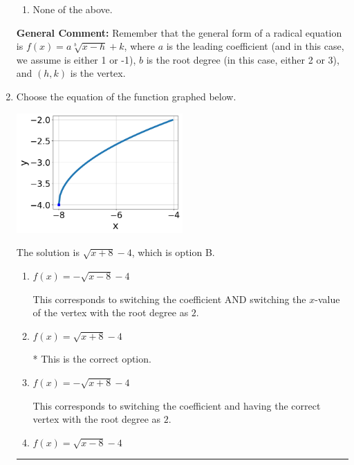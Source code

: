 \documentclass{extbook}[14pt]
\newcommand{\litem}[1]{\item #1

\rule{\textwidth}{0.4pt}}
\begin{document}
\begin{enumerate}
{\begin{enumerate}[label=\Alph*.]
\item None of the above.\end{enumerate}
\textbf{General Comment:} Remember that the general form of a radical equation is $ f(x) = a \sqrt[b]{x - h} + k $, where $a$ is the leading coefficient (and in this case, we assume is either 1 or -1), $b$ is the root degree (in this case, either 2 or 3), and $(h, k)$ is the vertex.
}
\litem{
Choose the equation of the function graphed below.

\begin{center}
    \includegraphics[width=0.5\textwidth]{../Figures/radicalGraphToEquationC.png}
\end{center}


The solution is \( \sqrt{x + 8} - 4 \), which is option B.\begin{enumerate}[label=\Alph*.]
\item \( f(x) = - \sqrt{x - 8} - 4 \)

This corresponds to switching the coefficient AND switching the $x$-value of the vertex with the root degree as $2$.
\item \( f(x) = \sqrt{x + 8} - 4 \)

* This is the correct option.
\item \( f(x) = - \sqrt{x + 8} - 4 \)

This corresponds to switching the coefficient and having the correct vertex with the root degree as $2$.
\item \( f(x) = \sqrt{x - 8} - 4 \)


\end{enumerate}}
\end{enumerate}
\end{document}
